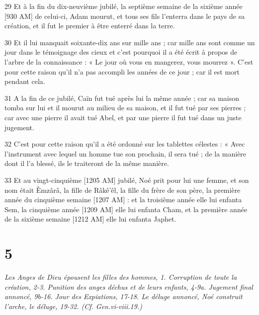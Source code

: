 \par 29 Et à la fin du dix-neuvième jubilé, la septième semaine de la sixième année [930 AM] de celui-ci, Adam mourut, et tous ses fils l'enterra dans le pays de sa création, et il fut le premier à être enterré dans la terre.
\par 30 Et il lui manquait soixante-dix ans sur mille ans ; car mille ans sont comme un jour dans le témoignage des cieux et c'est pourquoi il a été écrit à propos de l'arbre de la connaissance : « Le jour où vous en mangerez, vous mourrez ». C'est pour cette raison qu'il n'a pas accompli les années de ce jour ; car il est mort pendant cela.
\par 31 A la fin de ce jubilé, Caïn fut tué après lui la même année ; car sa maison tomba sur lui et il mourut au milieu de sa maison, et il fut tué par ses pierres ; car avec une pierre il avait tué Abel, et par une pierre il fut tué dans un juste jugement.
\par 32 C'est pour cette raison qu'il a été ordonné sur les tablettes célestes : « Avec l'instrument avec lequel un homme tue son prochain, il sera tué ; de la manière dont il l'a blessé, ils le traiteront de la même manière.
\par 33 Et au vingt-cinquième [1205 AM] jubilé, Noé prit pour lui une femme, et son nom était \`Emzârâ, la fille de Râkê'êl, la fille du frère de son père, la première année du cinquième semaine [1207 AM] : et la troisième année elle lui enfanta Sem, la cinquième année [1209 AM] elle lui enfanta Cham, et la première année de la sixième semaine [1212 AM] elle lui enfanta Japhet.

\chapter{5}

\par \textit{Les Anges de Dieu épousent les filles des hommes, 1. Corruption de toute la création, 2-3. Punition des anges déchus et de leurs enfants, 4-9a. Jugement final annoncé, 9b-16. Jour des Expiations, 17-18. Le déluge annoncé, Noé construit l'arche, le déluge, 19-32. (Cf. Gen.vi-viii.19.)}

